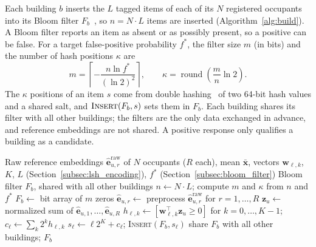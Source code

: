 \documentclass[pdflatex,sn-mathphys-num]{sn-jnl}%
\theoremstyle{thmstyleone}%
\theoremstyle{thmstyletwo}%
\theoremstyle{thmstylethree}%
\begin{document}
Each building $b$ inserts the $L$ tagged items of each of its $N$ registered occupants into its Bloom filter $F_b$~\cite{bloom1970}, so $n=N\cdot L$ items are inserted (Algorithm~\ref{alg:build}). A Bloom filter reports an item as absent or as possibly present, so a positive can be false. For a target false-positive probability $f^*$, the filter size $m$ (in bits) and the number of hash positions $\kappa$ are
\begin{equation}
    m =
    \left\lceil
    -\frac{n\ln f^*}{(\ln 2)^2}
    \right\rceil,
    \qquad
    \kappa =
    \operatorname{round}
    \left(\frac{m}{n}\ln 2\right).
    \label{eq:bloom_size}
\end{equation}
The $\kappa$ positions of an item $s$ come from double hashing~\cite{kirsch2006} of two 64-bit hash values and a shared salt, and $\textsc{Insert}(F_b,s)$ sets them in $F_b$. Each building shares its filter with all other buildings; the filters are the only data exchanged in advance, and reference embeddings are not shared. A positive response only qualifies a building as a candidate.

\begin{algorithm}[!t]
\footnotesize
\caption{LSH encoding and Bloom-filter construction at building $b$}
\label{alg:build}
\begin{algorithmic}[1]
\Require Raw reference embeddings $\hat{\mathbf{e}}^{\mathrm{raw}}_{u,r}$ of $N$ occupants ($R$ each), mean $\bar{\mathbf{x}}$, vectors $\mathbf{w}_{\ell,k}$, $K$, $L$ (Section~\ref{subsec:lsh_encoding}), $f^*$ (Section~\ref{subsec:bloom_filter})
\Ensure Bloom filter $F_b$, shared with all other buildings
\State $n\gets N\cdot L$; compute $m$ and $\kappa$ from $n$ and $f^*$ 
\State $F_b\gets$ bit array of $m$ zeros
  \State $\hat{\mathbf{e}}_{u,r}\gets$ preprocess $\hat{\mathbf{e}}^{\mathrm{raw}}_{u,r}$ for $r=1,\dots,R$ 
  \State $\mathbf{z}_u\gets$ normalized sum of $\hat{\mathbf{e}}_{u,1},\dots,\hat{\mathbf{e}}_{u,R}$ 
    \State $h_{\ell,k}\gets[\mathbf{w}_{\ell,k}^\top\mathbf{z}_u\geq 0]$ for $k=0,\dots,K-1$; $c_\ell\gets\sum_{k}2^{k}h_{\ell,k}$ 
    \State $s_\ell\gets\ell 2^K+c_\ell$; \textsc{Insert}$(F_b,s_\ell)$ 
  \EndFor
\EndFor
\State share $F_b$ with all other buildings; \Return $F_b$
\end{algorithmic}
\end{algorithm}
\end{document}
